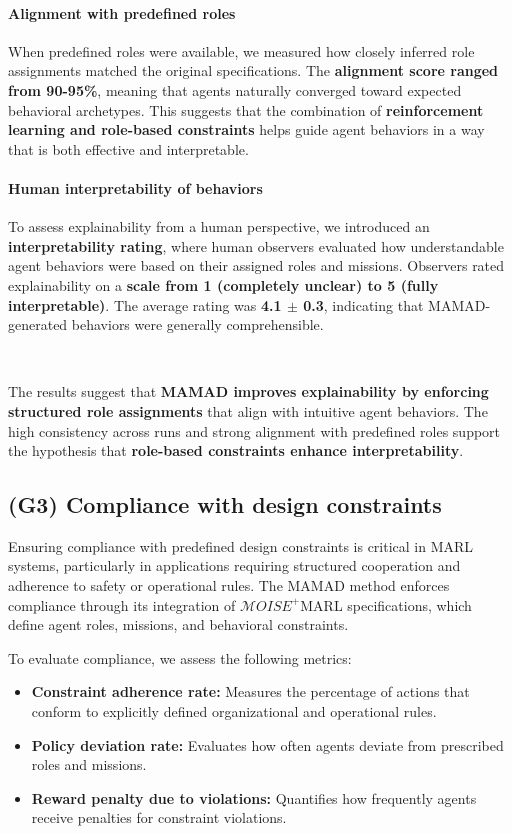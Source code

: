 \documentclass[pdflatex,sn-mathphys-num]{sn-jnl}%
\theoremstyle{thmstyleone}%
\theoremstyle{thmstyletwo}%
\theoremstyle{thmstylethree}%
\begin{document}
\paragraph{Alignment with predefined roles}
When predefined roles were available, we measured how closely inferred role assignments matched the original specifications. The \textbf{alignment score ranged from 90-95\%}, meaning that agents naturally converged toward expected behavioral archetypes. This suggests that the combination of \textbf{reinforcement learning and role-based constraints} helps guide agent behaviors in a way that is both effective and interpretable.

\paragraph{Human interpretability of behaviors}
To assess explainability from a human perspective, we introduced an \textbf{interpretability rating}, where human observers evaluated how understandable agent behaviors were based on their assigned roles and missions. Observers rated explainability on a \textbf{scale from 1 (completely unclear) to 5 (fully interpretable)}. The average rating was \textbf{4.1 $\pm$ 0.3}, indicating that MAMAD-generated behaviors were generally comprehensible.

\

The results suggest that \textbf{MAMAD improves explainability by enforcing structured role assignments} that align with intuitive agent behaviors. The high consistency across runs and strong alignment with predefined roles support the hypothesis that \textbf{role-based constraints enhance interpretability}.


\subsection{(G3) Compliance with design constraints}

Ensuring compliance with predefined design constraints is critical in MARL systems, particularly in applications requiring structured cooperation and adherence to safety or operational rules. The MAMAD method enforces compliance through its integration of $\mathcal{M}OISE^+$MARL specifications, which define agent roles, missions, and behavioral constraints. 

To evaluate compliance, we assess the following metrics:

\begin{itemize}
    \item \textbf{Constraint adherence rate:} Measures the percentage of actions that conform to explicitly defined organizational and operational rules.
    \item \textbf{Policy deviation rate:} Evaluates how often agents deviate from prescribed roles and missions.
    \item \textbf{Reward penalty due to violations:} Quantifies how frequently agents receive penalties for constraint violations.
\end{itemize}
\end{document}

